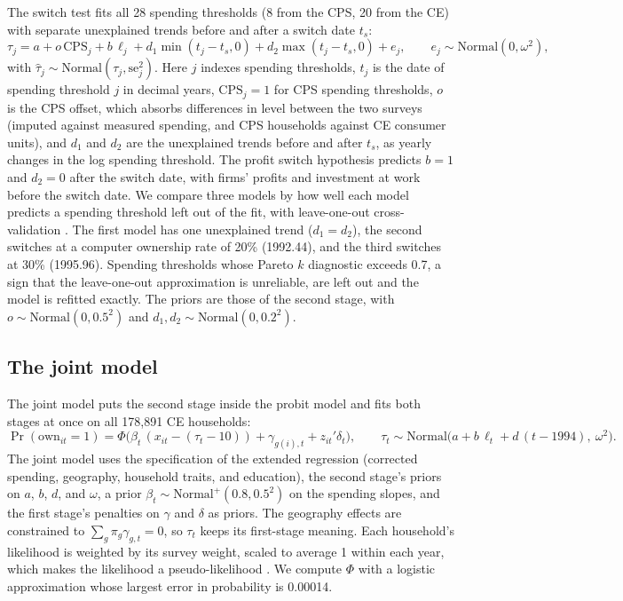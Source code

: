 \documentclass[11pt]{article}
\begin{document}
The switch test fits all 28 spending thresholds (8 from the CPS, 20 from the CE) with separate unexplained trends before and after a switch date $t_s$:
\begin{equation}
\tau_j = a + o\,\text{CPS}_j + b\,\ell_j + d_1 \min(t_j - t_s, 0) + d_2 \max(t_j - t_s, 0) + e_j, \qquad e_j \sim \text{Normal}(0, \omega^2),
\end{equation}
with $\hat\tau_j \sim \text{Normal}(\tau_j, \text{se}_j^2)$. Here $j$ indexes spending thresholds, $t_j$ is the date of spending threshold $j$ in decimal years, $\text{CPS}_j = 1$ for CPS spending thresholds, $o$ is the CPS offset, which absorbs differences in level between the two surveys (imputed against measured spending, and CPS households against CE consumer units), and $d_1$ and $d_2$ are the unexplained trends before and after $t_s$, as yearly changes in the log spending threshold. The profit switch hypothesis predicts $b = 1$ and $d_2 = 0$ after the switch date, with firms' profits and investment at work before the switch date. We compare three models by how well each model predicts a spending threshold left out of the fit, with leave-one-out cross-validation \citep{vehtari2017}. The first model has one unexplained trend ($d_1 = d_2$), the second switches at a computer ownership rate of 20\% (1992.44), and the third switches at 30\% (1995.96). Spending thresholds whose Pareto $k$ diagnostic exceeds 0.7, a sign that the leave-one-out approximation is unreliable, are left out and the model is refitted exactly. The priors are those of the second stage, with $o \sim \text{Normal}(0, 0.5^2)$ and $d_1, d_2 \sim \text{Normal}(0, 0.2^2)$.

\subsection{The joint model}
\label{app:jointmethod}

The joint model puts the second stage inside the probit model and fits both stages at once on all 178{,}891 CE households:
\begin{equation}
\Pr(\text{own}_{it} = 1) = \Phi\big(\beta_t\,(x_{it} - (\tau_t - 10)) + \gamma_{g(i),t} + z_{it}'\delta_t\big), \qquad
\tau_t \sim \text{Normal}\big(a + b\,\ell_t + d\,(t - 1994),\ \omega^2\big).
\end{equation}
The joint model uses the specification of the extended regression (corrected spending, geography, household traits, and education), the second stage's priors on $a$, $b$, $d$, and $\omega$, a prior $\beta_t \sim \text{Normal}^{+}(0.8, 0.5^2)$ on the spending slopes, and the first stage's penalties on $\gamma$ and $\delta$ as priors. The geography effects are constrained to $\sum_g \pi_g \gamma_{g,t} = 0$, so $\tau_t$ keeps its first-stage meaning. Each household's likelihood is weighted by its survey weight, scaled to average 1 within each year, which makes the likelihood a pseudo-likelihood \citep{savitsky2016}. We compute $\Phi$ with a logistic approximation \citep{bowling2009} whose largest error in probability is 0.00014.
\end{document}
